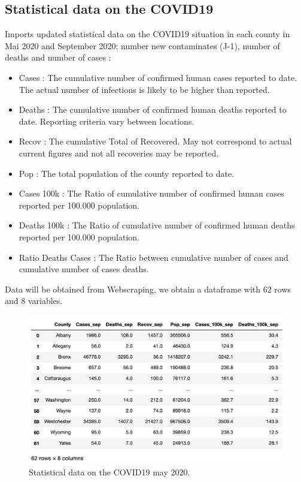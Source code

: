 \documentclass{article}
\begin{document}
\subsection{Statistical data on the COVID19 }
Imports updated statistical data on the COVID19 situation in each county in Mai 2020 and September 2020: number new contaminates (J-1),
number of deaths and number of cases :
\begin{itemize}
\item Cases : The cumulative number of confirmed human cases reported to date. The actual number of infections is likely to be higher than reported.
\item Deaths : The cumulative number of confirmed human deaths reported to date. Reporting criteria vary between locations.
\item Recov : The cumulative Total of Recovered. May not correspond to actual current figures and not all recoveries may be reported.
\item Pop : The total population of the county reported to date.
\item Cases 100k : The Ratio of cumulative number of confirmed human cases reported per 100.000 population.
\item Deaths 100k : The Ratio of cumulative number of confirmed human deaths reported per 100.000 population.
\item Ratio Deaths Cases : The Ratio between cumulative number of cases and cumulative number of cases deaths.
\end{itemize}
Data will be obtained from Webscraping,  we obtain a dataframe  with 62 rows and 8 variables.
\begin{figure}[h]
 \centering
\includegraphics[width=1\textwidth]{statistic1.png}
  \caption{Statistical data on the COVID19 may 2020.}
\end{figure}
\end{document}
